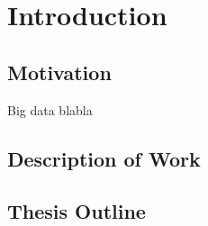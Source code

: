 \chapter{Introduction}

\section{Motivation}
Big data blabla

\section{Description of Work}


\section{Thesis Outline}

